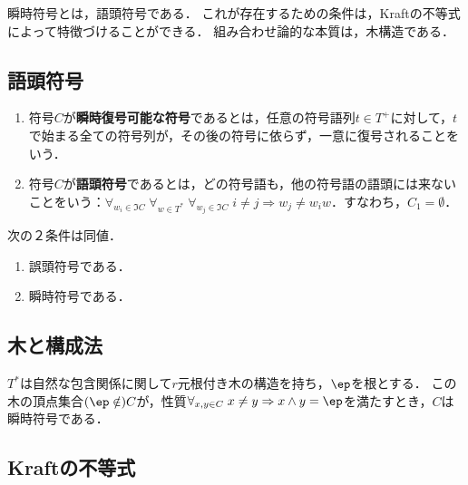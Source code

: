 \documentclass[uplatex,dvipdfmx]{jsreport}
\begin{document}
\begin{tcolorbox}[colframe=ForestGreen, colback=ForestGreen!10!white,breakable,colbacktitle=ForestGreen!40!white,coltitle=black,fonttitle=\bfseries\sffamily,
title=]
    瞬時符号とは，語頭符号である．
    これが存在するための条件は，Kraftの不等式によって特徴づけることができる．
    組み合わせ論的な本質は，木構造である．
\end{tcolorbox}

\subsection{語頭符号}

\begin{definition}\mbox{}
    \begin{enumerate}
        \item 符号$C$が\textbf{瞬時復号可能な符号}であるとは，任意の符号語列$t\in T^+$に対して，$t$で始まる全ての符号列が，その後の符号に依らず，一意に復号されることをいう．
        \item 符号$C$が\textbf{語頭符号}であるとは，どの符号語も，他の符号語の語頭には来ないことをいう：$\forall_{w_i\in\Im C}\;\forall_{w\in T^*}\;\forall_{w_j\in\Im C}\;i\ne j\Rightarrow w_j\ne w_iw$．すなわち，$C_1=\emptyset$．
    \end{enumerate}
\end{definition}

\begin{theorem}
    次の２条件は同値．
    \begin{enumerate}
        \item 誤頭符号である．
        \item 瞬時符号である．
    \end{enumerate}
\end{theorem}

\subsection{木と構成法}


\begin{discussion}
    $T^*$は自然な包含関係に関して$r$元根付き木の構造を持ち，$\ep$を根とする．
    この木の頂点集合$(\ep\notin)C$が，性質$\forall_{x,y\in C}\;x\ne y\Rightarrow x\land y=\ep$を満たすとき，$C$は瞬時符号である．
\end{discussion}

\subsection{Kraftの不等式}
\end{document}
